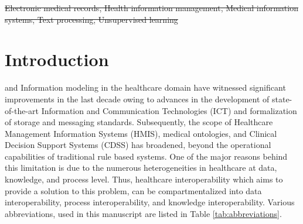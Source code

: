 \documentclass{ieeeaccess}
\begin{document}
\begin{keywords}
\sout{Electronic medical records, Health information management, Medical information systems,  Text processing, Unsupervised learning}
\end{keywords}

\titlepgskip=-15pt

\maketitle

\section{Introduction}
\label{intro}
 and Information modeling in the healthcare domain have witnessed significant improvements in the last decade owing to advances in the development of state-of-the-art Information and Communication Technologies (ICT) and formalization of storage and messaging standards. Subsequently, the scope of Healthcare Management Information Systems (HMIS), medical ontologies, and Clinical Decision Support Systems (CDSS) has broadened, beyond the operational capabilities of traditional rule based systems. One of the major reasons behind this limitation is due to the numerous heterogeneities in healthcare at data, knowledge, and process level. Thus, healthcare interoperability which aims to provide a solution to this problem, can be compartmentalized into data interoperability, process interoperability, and knowledge interoperability. Various abbreviations, used in this manuscript are listed in Table \ref{tab:abbreviations}.
\end{document}
